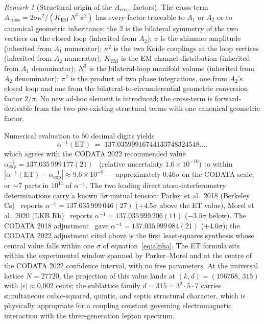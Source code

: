 \documentclass[11pt,a4paper]{article}
\theoremstyle{definition}
\theoremstyle{remark}
\newtheorem{remark}[theorem]{Remark}
\newcommand{\eps}{\varepsilon}
\begin{document}
\begin{remark}[Structural origin of the $A_{\mathrm{cross}}$ factors]\label{rem:Across-factors}
The cross-term $A_{\mathrm{cross}} = 2\sigma\kappa^{2}/(K_{\mathrm{EM}}\,N^{3}\,\pi^{2})$ has every factor traceable to $A_{1}$ or $A_{2}$ or to canonical geometric inheritance: the $2$ is the bilateral symmetry of the two vertices on the closed loop (inherited from $A_{2}$); $\sigma$ is the shimmer amplitude (inherited from $A_{1}$ numerator); $\kappa^{2}$ is the two Koide couplings at the loop vertices (inherited from $A_{2}$ numerator); $K_{\mathrm{EM}}$ is the EM channel distribution (inherited from $A_{1}$ denominator); $N^{3}$ is the bilateral-loop manifold volume (inherited from $A_{2}$ denominator); $\pi^{2}$ is the product of two phase integrations, one from $A_{2}$'s closed loop and one from the bilateral-to-circumferential geometric conversion factor $2/\pi$. No new ad-hoc element is introduced; the cross-term is forward-derivable from the two pre-existing structural terms with one canonical geometric factor.
\end{remark}

Numerical evaluation to $50$ decimal digits yields
\[
\alpha^{-1}(\mathrm{ET}) \;=\; 137.03599916744133748324548\ldots,
\]
which agrees with the CODATA 2022 recommended value $\alpha^{-1}_{\mathrm{exp}} = 137.035\,999\,177(21)$~\cite{CODATA2022} (relative uncertainty $1.6\times 10^{-10}$) to within $|\alpha^{-1}(\mathrm{ET}) - \alpha^{-1}_{\mathrm{exp}}| \approx 9.6\times 10^{-9}$ --- approximately $0.46\sigma$ on the CODATA scale, or $\sim 7$ parts in $10^{11}$ of $\alpha^{-1}$. The two leading direct atom-interferometry determinations carry a known $5\sigma$ mutual tension: Parker et al.~2018 (Berkeley Cs)~\cite{Parker2018} reports $\alpha^{-1} = 137.035\,999\,046(27)$ ($+4.5\sigma$ above the ET value), Morel et al.~2020 (LKB Rb)~\cite{Morel2020} reports $\alpha^{-1} = 137.035\,999\,206(11)$ ($-3.5\sigma$ below). The CODATA 2018 adjustment~\cite{CODATA2018} gave $\alpha^{-1} = 137.035\,999\,084(21)$ ($+4.0\sigma$); the CODATA 2022 adjustment cited above is the first least-squares synthesis whose central value falls within one $\sigma$ of equation~\eqref{eq:alpha}. The ET formula sits within the experimental window spanned by Parker--Morel and at the centre of the CODATA 2022 confidence interval, with no free parameters. At the universal lattice $N=27720$, the projection of this value lands at $(k,d)=(196768,\,315)$ with $|\eps|\approx 0.002$ cents; the sublattice family $d=315 = 3^{2}\cdot 5\cdot 7$ carries simultaneous cubic-squared, quintic, and septic structural character, which is physically appropriate for a coupling constant governing electromagnetic interaction with the three-generation lepton spectrum.
\end{document}
